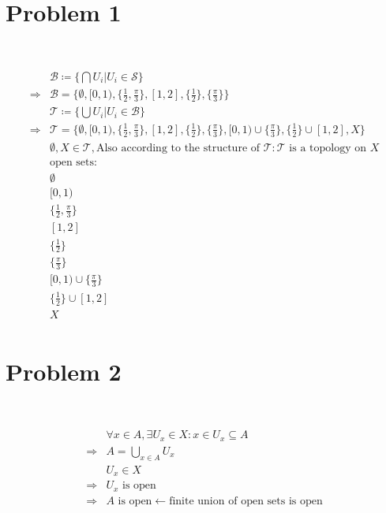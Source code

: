 \documentclass{article}
\begin{document}
\section*{Problem 1}

~

\begin{equation*}
\begin{split}
    &\mathcal{B} \coloneqq \{\bigcap U_i|U_i\in \mathcal{S} \}\\
    \Rightarrow&\mathcal{B}=\{\emptyset,[0,1),\{\frac{1}{2},\frac{\pi}{3}\},[1,2],\{\frac{1}{2}\},\{\frac{\pi}{3}\}\}\\
    &\mathcal{T} \coloneqq \{\bigcup U_i|U_i\in \mathcal{B} \}\\
    \Rightarrow&\mathcal{T}=\{\emptyset,[0,1),\{\frac{1}{2},\frac{\pi}{3}\},[1,2],\{\frac{1}{2}\},\{\frac{\pi}{3}\},[0,1)\cup\{\frac{\pi}{3}\},\{\frac{1}{2}\}\cup[1,2],X\}\\
    &\emptyset,X\in\mathcal{T},\text{Also according to the structure of }\mathcal{T}:\mathcal{T} \text{ is a topology on }X\\
    &\text{open sets}:\\
    &\emptyset\\
    &[0,1)\\
    &\{\frac{1}{2},\frac{\pi}{3}\}\\
    &[1,2]\\
    &\{\frac{1}{2}\}\\
    &\{\frac{\pi}{3}\}\\
    &[0,1)\cup\{\frac{\pi}{3}\}\\
    &\{\frac{1}{2}\}\cup[1,2]\\
    &X\\
\end{split}
\end{equation*}

\newpage

\section*{Problem 2}

~

\begin{equation*}
    \begin{split}
        &\forall x\in A, \exists U_x\in X:x\in U_x\subseteq A\\
        \Rightarrow&A=\bigcup_{x\in A}U_x\\
        &U_x\in X\\
        \Rightarrow&U_x\text{ is open}\\
        \Rightarrow&A\text{ is open}\leftarrow\text{finite union of open sets is open}\\
    \end{split}
\end{equation*}
\end{document}
